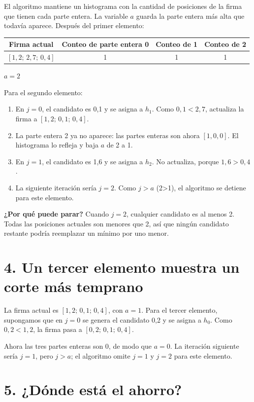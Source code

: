 \documentclass[11pt,a4paper]{article}
\begin{document}
El algoritmo mantiene un histograma con la cantidad de posiciones de la firma
que tienen cada parte entera. La variable $a$ guarda la parte entera más alta
que todavía aparece. Después del primer elemento:

\begin{center}
\begin{tabular}{cccc}
\toprule
Firma actual & Conteo de parte entera 0 & Conteo de 1 & Conteo de 2 \\
\midrule
$[1,2;\,2,7;\,0,4]$ & 1 & 1 & 1 \\
\bottomrule
\end{tabular}
\qquad $a=2$
\end{center}

Para el segundo elemento:

\begin{enumerate}[leftmargin=1.5em]
  \item En $j=0$, el candidato es 0,1 y se asigna a $h_1$. Como
        $0,1<2,7$, actualiza la firma a $[1,2;\,0,1;\,0,4]$.
  \item La parte entera 2 ya no aparece: las partes enteras son ahora
        $[1,0,0]$. El histograma lo refleja y baja $a$ de 2 a 1.
  \item En $j=1$, el candidato es 1,6 y se asigna a $h_2$. No actualiza,
        porque $1,6>0,4$.
  \item La siguiente iteración sería $j=2$. Como $j>a$ (2>1), el algoritmo
        se detiene para este elemento.
\end{enumerate}

\textbf{¿Por qué puede parar?} Cuando $j=2$, cualquier candidato es al menos
2. Todas las posiciones actuales son menores que 2, así que ningún candidato
restante podría reemplazar un mínimo por uno menor.

\section*{4. Un tercer elemento muestra un corte más temprano}

La firma actual es $[1,2;\,0,1;\,0,4]$, con $a=1$. Para el tercer elemento,
supongamos que en $j=0$ se genera el candidato 0,2 y se asigna a $h_0$. Como
$0,2<1,2$, la firma pasa a $[0,2;\,0,1;\,0,4]$.

Ahora las tres partes enteras son 0, de modo que $a=0$. La iteración siguiente
sería $j=1$, pero $j>a$; el algoritmo omite $j=1$ y $j=2$ para este elemento.

\section*{5. ¿Dónde está el ahorro?}
\end{document}
